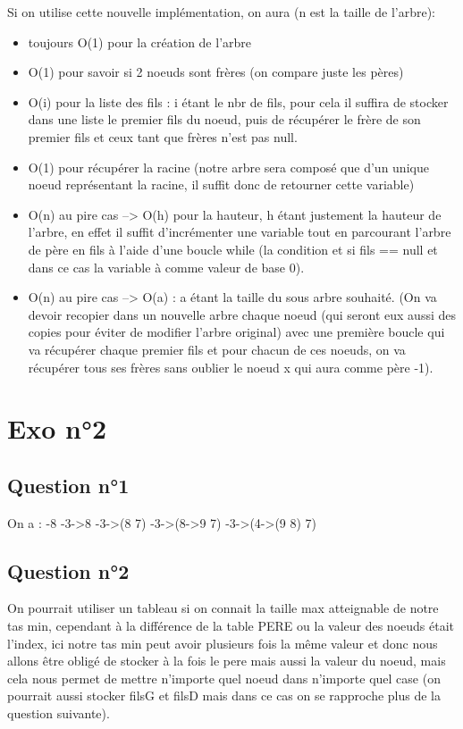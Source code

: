 \documentclass[11pt]{article}
\begin{document}
Si on utilise cette nouvelle implémentation, on aura (n est la taille de l'arbre): 
\begin{itemize}
\item toujours O(1) pour la création de l'arbre
\item O(1) pour savoir si 2 noeuds sont frères (on compare juste les pères)
\item O(i) pour la liste des fils : i étant le nbr de fils, pour cela il suffira de stocker dans une liste le premier fils du noeud, puis de récupérer le frère de son premier fils et ceux tant que frères n'est pas null.
\item O(1) pour récupérer la racine (notre arbre sera composé que d'un unique noeud représentant la racine, il suffit donc de retourner cette variable)
\item O(n) au pire cas --> O(h) pour la hauteur, h étant justement la hauteur de l'arbre, en effet il suffit d'incrémenter une variable tout en parcourant l'arbre de père en fils à l'aide d'une boucle while (la condition et si fils == null et dans ce cas la variable à comme valeur de base 0).
\item O(n) au pire cas --> O(a) : a étant la taille du sous arbre souhaité. (On va devoir recopier dans un nouvelle arbre chaque noeud (qui seront eux aussi des copies pour éviter de modifier l'arbre original) avec une première boucle qui va récupérer chaque premier fils et pour chacun de ces noeuds, on va récupérer tous ses frères sans oublier le noeud x qui aura comme père -1).
\end{itemize}

\section{Exo n°2}
\label{sec:org0dcd688}

\subsection{Question n°1}
\label{sec:org6d8da8f}

On a : 
-8
-3->8
-3->(8 7)
-3->(8->9 7)
-3->(4->(9 8) 7)

\subsection{Question n°2}
\label{sec:org4e79a65}
On pourrait utiliser un tableau si on connait la taille max atteignable de notre tas min, cependant à la différence de la table PERE ou la valeur des noeuds était l'index, ici notre tas min peut avoir plusieurs fois la même valeur et donc nous allons être obligé de stocker à la fois le pere mais aussi la valeur du noeud, mais cela nous permet de mettre n'importe quel noeud dans n'importe quel case (on pourrait aussi stocker filsG et filsD mais dans ce cas on se rapproche plus de la question suivante).
\end{document}
